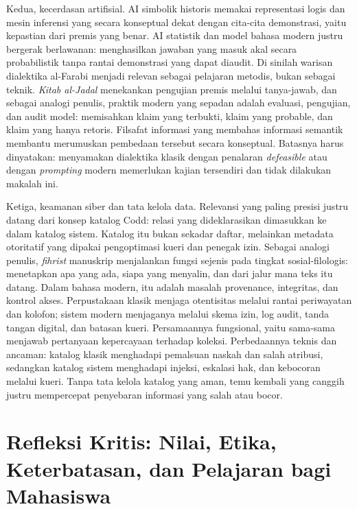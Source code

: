\documentclass[12pt,a4paper]{article}
\begin{document}
Kedua, kecerdasan artifisial. AI simbolik historis memakai representasi logis dan mesin inferensi yang secara konseptual dekat dengan cita-cita demonstrasi, yaitu kepastian dari premis yang benar. AI statistik dan model bahasa modern justru bergerak berlawanan: menghasilkan jawaban yang masuk akal secara probabilistik tanpa rantai demonstrasi yang dapat diaudit. Di sinilah warisan dialektika al-Farabi menjadi relevan sebagai pelajaran metodis, bukan sebagai teknik. \emph{Kitab al-Jadal} menekankan pengujian premis melalui tanya-jawab,\autocite{dipasquale2019} dan sebagai analogi penulis, praktik modern yang sepadan adalah evaluasi, pengujian, dan audit model: memisahkan klaim yang terbukti, klaim yang probable, dan klaim yang hanya retoris. Filsafat informasi yang membahas informasi semantik membantu merumuskan pembedaan tersebut secara konseptual.\autocite{adriaans2023} Batasnya harus dinyatakan: menyamakan dialektika klasik dengan penalaran \emph{defeasible} atau dengan \emph{prompting} modern memerlukan kajian tersendiri dan tidak dilakukan makalah ini.

Ketiga, keamanan siber dan tata kelola data. Relevansi yang paling presisi justru datang dari konsep katalog Codd: relasi yang dideklarasikan dimasukkan ke dalam katalog sistem.\autocite[381]{codd1970} Katalog itu bukan sekadar daftar, melainkan metadata otoritatif yang dipakai pengoptimasi kueri dan penegak izin. Sebagai analogi penulis, \emph{fihrist} manuskrip menjalankan fungsi sejenis pada tingkat sosial-filologis: menetapkan apa yang ada, siapa yang menyalin, dan dari jalur mana teks itu datang. Dalam bahasa modern, itu adalah masalah provenance, integritas, dan kontrol akses. Perpustakaan klasik menjaga otentisitas melalui rantai periwayatan dan kolofon; sistem modern menjaganya melalui skema izin, log audit, tanda tangan digital, dan batasan kueri. Persamaannya fungsional, yaitu sama-sama menjawab pertanyaan kepercayaan terhadap koleksi. Perbedaannya teknis dan ancaman: katalog klasik menghadapi pemalsuan naskah dan salah atribusi, sedangkan katalog sistem menghadapi injeksi, eskalasi hak, dan kebocoran melalui kueri. Tanpa tata kelola katalog yang aman, temu kembali yang canggih justru mempercepat penyebaran informasi yang salah atau bocor.

\section{Refleksi Kritis: Nilai, Etika, Keterbatasan, dan Pelajaran bagi Mahasiswa}
\end{document}
